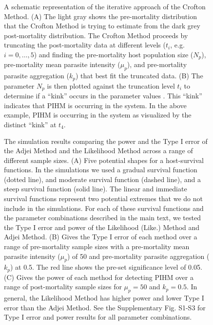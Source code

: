 \documentclass[12pt, a4paper]{article}
\begin{document}


\newpage

\begin{figure}

    \captionsetup{justification=raggedright, singlelinecheck=false}

    \caption{\doublespacing A schematic representation of the iterative approach of the Crofton Method. (A) The light gray shows the pre-mortality distribution that the Crofton Method is trying to estimate from the dark grey post-mortality distribution.  The Crofton Method proceeds by truncating the post-mortality data at different levels ($t_i$, e.g. $i= 0, \dots, 5$) and finding the pre-mortality host population size ($N_p$), pre-mortality mean parasite intensity ($\mu_p$), and pre-mortality parasite aggregation ($k_p$) that best fit the truncated data. (B) The parameter $N_p$ is then plotted against the truncation level $t_i$ to determine if a ``kink'' occurs in the parameter values  \citep{Lester1984}. This ``kink'' indicates that PIHM is occurring in the system. In the above example, PIHM is occurring in the system as visualized by the distinct ``kink'' at $t_4$.}
    \label{fig:crofton}

\end{figure}

\begin{figure}

    \captionsetup{justification=raggedright, singlelinecheck=false}


    \caption{\doublespacing The simulation results comparing the power and the Type I error of the Adjei Method and the Likelihood Method across a range of different sample sizes. (A) Five potential shapes for a host-survival functions. In the simulations we used a gradual survival function (dotted line), and moderate survival function (dashed line), and a steep survival function (solid line). The linear and immediate survival functions represent two potential extremes that we do not include in the simulations. For each of these survival functions and the parameter combinations described in the main text, we tested the Type I error and power of the Likelihood (Like.) Method and Adjei Method. (B) Gives the Type I error of each method over a range of pre-mortality sample sizes with a pre-mortality mean parasite intensity ($\mu_p$) of 50 and pre-mortality parasite aggregation ($k_p$) at 0.5. The red line shows the pre-set significance level of 0.05. (C) Gives the power of each method for detecting PIHM over a range of post-mortality sample sizes for $\mu_p = 50$ and $k_p = 0.5$.  In general, the Likelihood Method has higher power and lower Type I error than the Adjei Method.  See the Supplementary Fig. S1-S3 for Type I error and power results for all parameter combinations.}

\label{fig:question1}

\end{figure}
\end{document}

